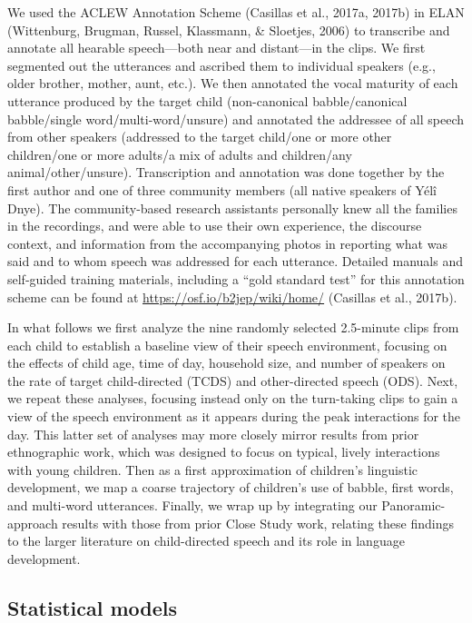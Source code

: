 \documentclass[,man,floatsintext]{apa6}
\begin{document}
We used the ACLEW Annotation Scheme (Casillas et al., 2017a, 2017b) in
ELAN (Wittenburg, Brugman, Russel, Klassmann, \& Sloetjes, 2006) to
transcribe and annotate all hearable speech---both near and distant---in
the clips. We first segmented out the utterances and ascribed them to
individual speakers (e.g., older brother, mother, aunt, etc.). We then
annotated the vocal maturity of each utterance produced by the target
child (non-canonical babble/canonical babble/single
word/multi-word/unsure) and annotated the addressee of all speech from
other speakers (addressed to the target child/one or more other
children/one or more adults/a mix of adults and children/any
animal/other/unsure). Transcription and annotation was done together by
the first author and one of three community members (all native speakers
of Yélî Dnye). The community-based research assistants personally knew
all the families in the recordings, and were able to use their own
experience, the discourse context, and information from the accompanying
photos in reporting what was said and to whom speech was addressed for
each utterance. Detailed manuals and self-guided training materials,
including a \enquote{gold standard test} for this annotation scheme can
be found at \url{https://osf.io/b2jep/wiki/home/} (Casillas et al.,
2017b).

In what follows we first analyze the nine randomly selected 2.5-minute
clips from each child to establish a baseline view of their speech
environment, focusing on the effects of child age, time of day,
household size, and number of speakers on the rate of target
child-directed (TCDS) and other-directed speech (ODS). Next, we repeat
these analyses, focusing instead only on the turn-taking clips to gain a
view of the speech environment as it appears during the peak
interactions for the day. This latter set of analyses may more closely
mirror results from prior ethnographic work, which was designed to focus
on typical, lively interactions with young children. Then as a first
approximation of children's linguistic development, we map a coarse
trajectory of children's use of babble, first words, and multi-word
utterances. Finally, we wrap up by integrating our Panoramic-approach
results with those from prior Close Study work, relating these findings
to the larger literature on child-directed speech and its role in
language development.

\subsection{Statistical models}\label{statistical-models}
\end{document}

